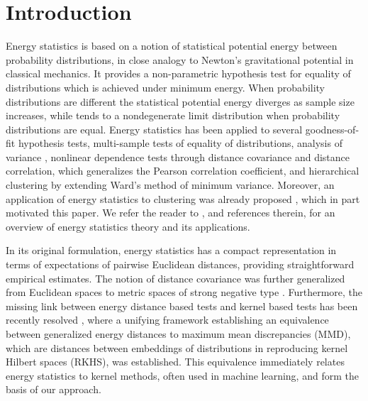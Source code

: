 \documentclass[aps,preprint,nofootinbib,floatfix]{revtex4-1}
\begin{document}
%


\section{Introduction}

Energy statistics \cite{Szkely2013}
is based on a 
notion of statistical potential energy between probability distributions,
in close analogy to Newton's gravitational potential in classical mechanics. 
It provides a non-parametric hypothesis test for equality of 
distributions which is achieved 
under minimum energy. When probability distributions are different the 
statistical potential energy diverges as sample size increases, while tends 
to a nondegenerate limit distribution when probability
distributions are equal. 
Energy statistics has been applied to several goodness-of-fit 
hypothesis tests, multi-sample tests of equality of distributions, 
analysis of variance \cite{RizzoVariance}, nonlinear dependence tests through
distance covariance and distance correlation, which generalizes the Pearson
correlation coefficient, and hierarchical clustering \cite{RizzoClustering} 
by extending Ward's method of minimum variance. Moreover, an application of 
energy statistics to clustering was already proposed \cite{Kgroups}, 
which in part motivated this paper. We refer the reader to \cite{Szkely2013}, 
and references therein, for an overview of energy statistics theory and 
its applications.

In its original formulation, energy statistics has a compact representation
in terms of expectations of pairwise Euclidean distances, providing
straightforward empirical estimates. 
The notion of distance covariance was further generalized from Euclidean 
spaces to metric spaces of strong negative type \cite{Lyons}. Furthermore, 
the missing link between energy distance based tests and kernel 
based tests has 
been recently resolved \cite{Sejdinovic2013}, where a unifying framework
establishing an equivalence between generalized energy distances to maximum
mean discrepancies (MMD), which are distances between embeddings of 
distributions in reproducing kernel Hilbert spaces (RKHS), was established. 
This equivalence immediately relates energy statistics to
kernel methods, often used in machine learning, and form the basis 
of our approach.
\end{document}
